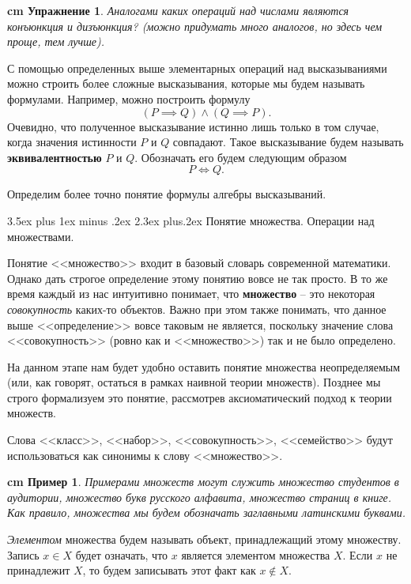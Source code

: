 \documentclass[12pt, russian]{article}
\makeatletter
\renewcommand\subsection{\@startsection {subsection}{2}{\parindent}%
{3.5ex plus 1ex minus .2ex}%
{2.3ex plus.2ex}%
{\normalfont\large\bfseries}}
\newtheorem{example}{\hskip 0.5 cm Пример}%
\newtheorem{exercise}{\hskip 0.5 cm Упражнение}%
\makeatother
\begin{document}
\begin{exercise}
	Аналогами каких операций над числами являются конъюнкция и дизъюнкция? (можно придумать много аналогов, но здесь чем проще, тем лучше).
\end{exercise}

С помощью определенных выше элементарных операций над высказываниями можно строить более сложные высказывания, которые мы будем называть формулами.  Например, можно построить формулу
$$
(P \implies Q) \wedge (Q \implies P).
$$
Очевидно, что полученное высказывание истинно лишь только в том случае, когда значения истинности $P$ и $Q$ совпадают. Такое высказывание будем называть \textbf{эквивалентностью} $P$ и $Q$. Обозначать его будем следующим образом
$$
P  \Longleftrightarrow  Q.
$$

Определим более точно понятие формулы алгебры высказываний. 


\subsection{Понятие множества. Операции над множествами.}

Понятие <<множество>> входит в базовый словарь современной математики. Однако дать строгое определение этому понятию вовсе не так просто. В то же время каждый из нас интуитивно понимает, что \textbf{множество} -- это некоторая \textit{совокупность} каких-то объектов. Важно при этом также понимать, что данное выше <<определение>> вовсе таковым не является, поскольку значение слова <<совокупность>> (ровно как и <<множество>>) так и не было определено.

На данном этапе нам будет удобно оставить понятие множества неопределяемым (или, как говорят, остаться в рамках наивной теории множеств). Позднее мы строго формализуем это понятие, рассмотрев аксиоматический подход к теории множеств.

Слова <<класс>>, <<набор>>, <<совокупность>>, <<семейство>> будут использоваться как синонимы к слову <<множество>>.

\begin{example}
	Примерами множеств могут служить множество студентов в аудитории,  множество букв русского алфавита, множество страниц в книге. Как правило, множества мы будем обозначать заглавными латинскими буквами.
\end{example}

\textit{Элементом} множества будем называть объект, принадлежащий этому множеству. Запись $x \in X$ будет означать, что $x$ является элементом множества $X$. Если $x$ не принадлежит $X$, то будем записывать этот факт как $x \notin X$.
\end{document}

